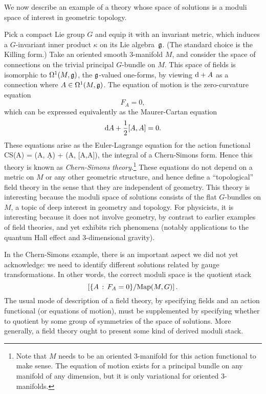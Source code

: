 \documentclass[11pt]{amsart}
\begin{document}
We now describe an example of a theory whose space of solutions is a moduli space of interest in geometric topology.

\begin{eg}
Pick a compact Lie group $G$ and equip it with an invariant metric,
which induces a $G$-invariant inner product $\kappa$ on its Lie algebra~$\mathfrak g$.
(The standard choice is the Killing form.)
Take an oriented smooth 3-manifold $M$, 
and consider the space of connections on the trivial principal $G$-bundle on $M$.
This space of fields is isomorphic to $\Omega^1(M, \mathfrak g)$, the $\mathfrak g$-valued one-forms, 
by viewing ${\rm d} + A$ as a connection where $A \in \Omega^1(M, \mathfrak g)$.
The equation of motion is the zero-curvature equation
\[
F_A = 0,
\]
which can be expressed equivalently as the Maurer-Cartan equation
\[
{\rm d} A + \frac{1}{2} [A,A] = 0.
\]
These equations arise as the Euler-Lagrange equation for the action functional
\beqn
\label{eqn:CS}
CS(A) =  \kappa(A, \d A) +  \kappa(A, [A,A]),
\eeqn
the integral of a Chern-Simons form.
Hence this theory is known as {\em Chern-Simons theory}.\footnote{Note that $M$ needs to be an oriented 3-manifold for this action functional to make sense.
The equation of motion exists for a principal bundle on any manifold of any dimension,
but it is only variational for oriented 3-manifolds.}
These equations do not depend on a metric on $M$ or any other geometric structure,
and hence define a ``topological'' field theory in the sense that they are independent of geometry.
This theory is interesting because the moduli space of solutions consists of the flat $G$-bundles on $M$,
a topic of deep interest in geometry and topology.
For physicists, it is interesting because it does not involve geometry, 
by contrast to earlier examples of field theories,
and yet exhibits rich phenomena (notably applications to the quantum Hall effect and 3-dimensional gravity).
\end{eg}

\begin{rmk}
In the Chern-Simons example, there is an important aspect we did not yet acknowledge:
we need to identify different solutions related by gauge transformations.
In other words, the correct moduli space is the quotient stack
\[
\left[ \{ A \,:\, F_A = 0\}/{\rm Map}(M,G) \right].
\]
The usual mode of description of a field theory, by specifying fields and an action functional (or equations of motion), 
must be supplemented by specifying whether to quotient by some group of symmetries of the space of solutions.
More generally, a field theory ought to present some kind of derived moduli stack.
\end{rmk}
\end{document}
